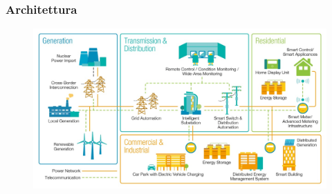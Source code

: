 
\begin{frame}[fragile]
  \frametitle{Architettura}
	\begin{figure}[h] 
		\includegraphics[scale=0.7]{imgs/architecture.jpg}
	\end{figure}
  
\end{frame}